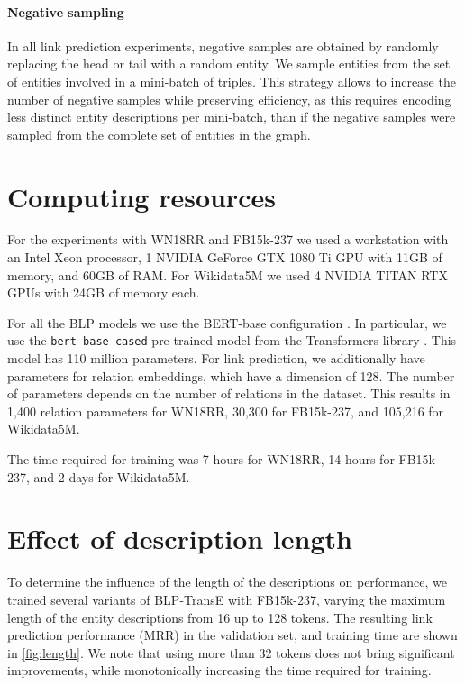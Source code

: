 \documentclass[sigconf]{acmart}
\begin{document}
\paragraph{Negative sampling} In all link prediction experiments, negative samples are obtained by randomly replacing the head or tail with a random entity. We sample entities from the set of entities involved in a mini-batch of triples. This strategy allows to increase the number of negative samples while preserving efficiency, as this requires encoding less distinct entity descriptions per mini-batch, than if the negative samples were sampled from the complete set of entities in the graph.

\section{Computing resources}
\label{app:computing}

For the experiments with WN18RR and FB15k-237 we used a workstation with an Intel Xeon processor, 1 NVIDIA GeForce GTX 1080 Ti GPU with 11GB of memory, and 60GB of RAM. For Wikidata5M we used 4 NVIDIA TITAN RTX GPUs with 24GB of memory each.

For all the BLP models we use the BERT-base configuration \citep{devlin2019bert}. In particular, we use the \texttt{bert-base-cased} pre-trained model from the Transformers library \citep{Wolf2019HuggingFacesTS}. This model has 110 million parameters. For link prediction, we additionally have parameters for relation embeddings, which have a dimension of 128. The number of parameters depends on the number of relations in the dataset. This results in 1,400 relation parameters for WN18RR, 30,300 for FB15k-237, and 105,216 for Wikidata5M.

The time required for training was 7 hours for WN18RR, 14 hours for FB15k-237, and 2 days for Wikidata5M.

\section{Effect of description length}
\label{app:length}

To determine the influence of the length of the descriptions on performance, we trained several variants of BLP-TransE with FB15k-237, varying the maximum length of the entity descriptions from 16 up to 128 tokens. The resulting link prediction performance (MRR) in the validation set, and training time are shown in \autoref{fig:length}. We note that using more than 32 tokens does not bring significant improvements, while monotonically increasing the time required for training.
\end{document}
